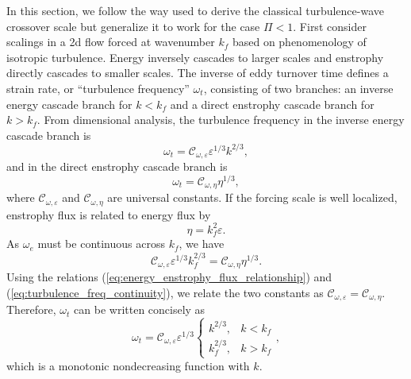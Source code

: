 \documentclass{ametsoc}
\begin{document}
In this section, we follow the way \citet{Vallis1993} used to derive 
the classical turbulence-wave crossover scale but generalize it
to work for the case $\Pi<1$. First consider scalings in a 2d flow forced
at wavenumber $k_{f}$ based on phenomenology of isotropic turbulence. 
Energy inversely cascades to larger scales and
enstrophy directly cascades to smaller scales. The inverse of eddy
turnover time defines a strain rate, or ``turbulence frequency''
$\omega_{t}$, consisting of two branches: an inverse energy cascade
branch for $k<k_{f}$ and a direct enstrophy cascade branch for $k>k_{f}$.
From dimensional analysis, the turbulence frequency in the inverse
energy cascade branch is
\begin{equation}
\omega_{t}=\mathcal{C}_{\omega,\varepsilon}\varepsilon^{1/3}k^{2/3},\label{eq:eddy_turnover_freq_inverse_cascade}
\end{equation}
and in the direct enstrophy cascade branch is
\begin{equation}
\omega_{t}=\mathcal{C}_{\omega,\eta}\eta^{1/3},\label{eq:eddy_turnover_freq_direct_enstrophy_cascade}
\end{equation}
where $\mathcal{C}_{\omega,\varepsilon}$ and $\mathcal{C}_{\omega,\eta}$
are universal constants. If the forcing scale is well localized, enstrophy
flux is related to energy flux by
\begin{equation}
\eta=k_{f}^{2}\varepsilon.\label{eq:energy_enstrophy_flux_relationship}
\end{equation}
As $\omega_{e}$ must be continuous across $k_{f}$, we have
\begin{equation}
\mathcal{C}_{\omega,\varepsilon}\varepsilon^{1/3}k_{f}^{2/3}=\mathcal{C}_{\omega,\eta}\eta^{1/3}.\label{eq:turbulence_freq_continuity}
\end{equation}
Using the relations (\ref{eq:energy_enstrophy_flux_relationship}) and (\ref{eq:turbulence_freq_continuity}),
we relate the two constants as $\mathcal{C}_{\omega,\varepsilon}=\mathcal{C}_{\omega,\eta}$.
Therefore, $\omega_{t}$ can be written concisely as
\begin{equation}
\omega_{t}=\mathcal{C}_{\omega,\varepsilon}\varepsilon^{1/3}\begin{cases}
k^{2/3}, & k<k_{f}\\
k_{f}^{2/3}, & k>k_{f}
\end{cases},\label{eq:eddy_turnover_freq_general_form}
\end{equation}
which is a monotonic nondecreasing function with $k$.
\end{document}
